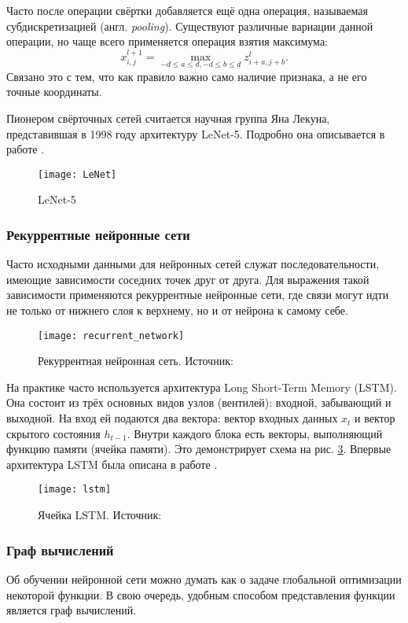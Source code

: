Часто после операции свёртки добавляется ещё одна операция, называемая
субдискретизацией (англ. \textit{pooling}). Существуют различные вариации данной
операции, но чаще всего применяется операция взятия максимума:
\[
x^{l+1}_{i,j} = \max_{{-d \leq a \leq d, -d \leq b \leq d}} z^{l}_{i+a, j+b}.
\]
Связано это с тем, что как правило важно само наличие признака, а не его точные
координаты\cite{deeplearning}.

Пионером свёрточных сетей считается научная группа Яна Лекуна, представившая в
1998 году архитектуру LeNet-5. Подробно она описывается в работе \cite{LeCun}.

\begin{figure}[h]
\centering
\texttt{[image: LeNet]}
\caption{LeNet-5}
\label{fig:lenet}
\end{figure}

\subsubsection{Рекуррентные нейронные сети}
Часто исходными данными для нейронных сетей служат последовательности, имеющие
зависимости соседних точек друг от друга. Для выражения такой зависимости
применяются рекуррентные нейронные сети, где связи могут идти не только от
нижнего слоя к верхнему, но и от нейрона к самому себе. 

\begin{figure}[h]
\centering
\texttt{[image: recurrent\_network]}
\caption{Рекуррентная нейронная сеть. Источник: \cite{deeplearning}}
\label{fig:recurrent_network}
\end{figure}

На практике часто используется архитектура Long Short-Term Memory (LSTM). Она
состоит из трёх основных видов узлов (вентилей): входной, забывающий и выходной.
На вход ей подаются два вектора: вектор входных данных $x_t$ и вектор скрытого
состояния $h_{t-1}$. Внутри каждого блока есть векторы, выполняющий функцию
памяти (ячейка памяти)\cite{deeplearning}. Это демонстрирует схема на рис. \ref{fig:lstm}.
Впервые архитектура LSTM была описана в работе \cite{Hochreiter1997}.
\begin{figure}[h]
\centering
\texttt{[image: lstm]}
\caption{Ячейка LSTM. Источник: \cite{deeplearning}}
\label{fig:lstm}
\end{figure}

\subsubsection{Граф вычислений}
Об обучении нейронной сети можно думать как о задаче глобальной оптимизации
некоторой функции. В свою очередь, удобным способом представления функции
является граф вычислений.

